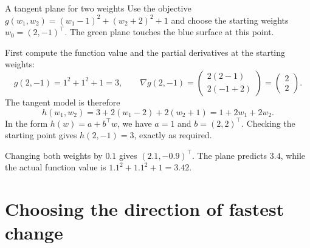 \documentclass[a4paper,12pt,oneside]{report}
\begin{document}
\begin{framedexample}{A tangent plane for two weights}
Use the objective $g(w_1,w_2)=(w_1-1)^2+(w_2+2)^2+1$ and
choose the starting weights $w_0=(2,-1)^\top$. The green plane
touches the blue surface at this point.

\begin{center}
\end{center}

First compute the function value and the partial derivatives at
the starting weights:
\[
  g(2,-1)=1^2+1^2+1=3,\qquad
  \nabla g(2,-1)=
  \begin{pmatrix}2(2-1)\\2(-1+2)\end{pmatrix}
  =\begin{pmatrix}2\\2\end{pmatrix}.
\]
The tangent model is therefore
\[
  h(w_1,w_2)=3+2(w_1-2)+2(w_2+1)=1+2w_1+2w_2.
\]
In the form $h(w)=a+b^\top w$, we have $a=1$ and $b=(2,2)^\top$.
Checking the starting point gives $h(2,-1)=3$, exactly as required.

Changing both weights by $0.1$ gives $(2.1,-0.9)^\top$.
The plane predicts $3.4$, while the actual function value is
$1.1^2+1.1^2+1=3.42$.
\end{framedexample}

\clearpage
\section{Choosing the direction of fastest change}
\end{document}
